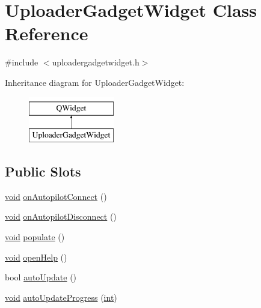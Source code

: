 \hypertarget{class_uploader_gadget_widget}{\section{Uploader\-Gadget\-Widget Class Reference}
\label{class_uploader_gadget_widget}
}


{\ttfamily \#include $<$uploadergadgetwidget.\-h$>$}

Inheritance diagram for Uploader\-Gadget\-Widget\-:\begin{figure}[H]
\begin{center}
\leavevmode
\includegraphics[height=2.000000cm]{class_uploader_gadget_widget}
\end{center}
\end{figure}
\subsection*{Public Slots}
\begin{DoxyCompactItemize}
\item 
\hyperlink{group___u_a_v_objects_plugin_ga444cf2ff3f0ecbe028adce838d373f5c}{void} \hyperlink{group___y_modem_uploader_gaea63c2ee4a2337a9c75b7e6908a07f68}{on\-Autopilot\-Connect} ()
\item 
\hyperlink{group___u_a_v_objects_plugin_ga444cf2ff3f0ecbe028adce838d373f5c}{void} \hyperlink{group___y_modem_uploader_ga1b05eaf13f62105422817f202a60d4c5}{on\-Autopilot\-Disconnect} ()
\item 
\hyperlink{group___u_a_v_objects_plugin_ga444cf2ff3f0ecbe028adce838d373f5c}{void} \hyperlink{group___y_modem_uploader_ga5c67435d0108ea6ee60ef37fd1ad3298}{populate} ()
\item 
\hyperlink{group___u_a_v_objects_plugin_ga444cf2ff3f0ecbe028adce838d373f5c}{void} \hyperlink{group___y_modem_uploader_ga49b9f0a5fc35f08fc0ee463dedcfe341}{open\-Help} ()
\item 
bool \hyperlink{group___y_modem_uploader_gae4f6b196112377e3983e45e785c14242}{auto\-Update} ()
\item 
\hyperlink{group___u_a_v_objects_plugin_ga444cf2ff3f0ecbe028adce838d373f5c}{void} \hyperlink{group___y_modem_uploader_gaa59bd4196108e1a79e22ee1d10cf4a92}{auto\-Update\-Progress} (\hyperlink{ioapi_8h_a787fa3cf048117ba7123753c1e74fcd6}{int})
\end{DoxyCompactItemize}
